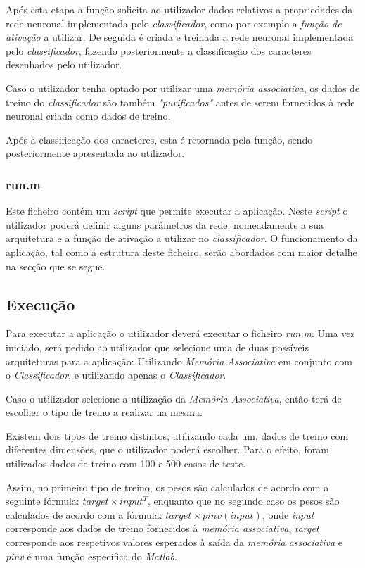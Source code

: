 \documentclass{article}
\begin{document}
Após esta etapa a função solicita ao utilizador dados relativos a propriedades da rede neuronal implementada pelo \emph{classificador}, como por exemplo a \emph{função de ativação} a utilizar. De seguida é criada e treinada a rede neuronal implementada pelo \emph{classificador}, fazendo posteriormente a classificação dos caracteres desenhados pelo utilizador.

Caso o utilizador tenha optado por utilizar uma \emph{memória associativa}, os dados de treino do \emph{classificador} são também \emph{"purificados"} antes de serem fornecidos à rede neuronal criada como dados de treino.

Após a classificação dos caracteres, esta é retornada pela função, sendo posteriormente apresentada ao utilizador.

\subsubsection{run.m}

Este ficheiro contém um \emph{script} que permite executar a aplicação. Neste \emph{script} o utilizador poderá definir alguns parâmetros da rede, nomeadamente a sua arquitetura e a função de ativação a utilizar no \emph{classificador}. O funcionamento da aplicação, tal como a estrutura deste ficheiro, serão abordados com maior detalhe na secção que se segue.

\pagebreak

\subsection{Execução}

Para executar a aplicação o utilizador deverá executar o ficheiro \emph{run.m}. Uma vez iniciado, será pedido ao utilizador que selecione uma de duas possíveis arquiteturas para a aplicação: Utilizando \emph{Memória Associativa} em conjunto com o \emph{Classificador}, e utilizando apenas o \emph{Classificador}.

Caso o utilizador selecione a utilização da \emph{Memória Associativa}, então terá de escolher o tipo de treino a realizar na mesma.

Existem dois tipos de treino distintos, utilizando cada um, dados de treino com diferentes dimensões, que o utilizador poderá escolher. Para o efeito, foram utilizados dados de treino com 100 e 500 casos de teste.

Assim, no primeiro tipo de treino, os pesos são calculados de acordo com a seguinte fórmula: $target\times input^T$, enquanto que no segundo caso os pesos são calculados de acordo com a fórmula: $target\times pinv(input)$, onde \emph{input} corresponde aos dados de treino fornecidos à \emph{memória associativa}, \emph{target} corresponde aos respetivos valores esperados à saída da \emph{memória associativa} e \emph{pinv} é uma função específica do \emph{Matlab}.
\end{document}
